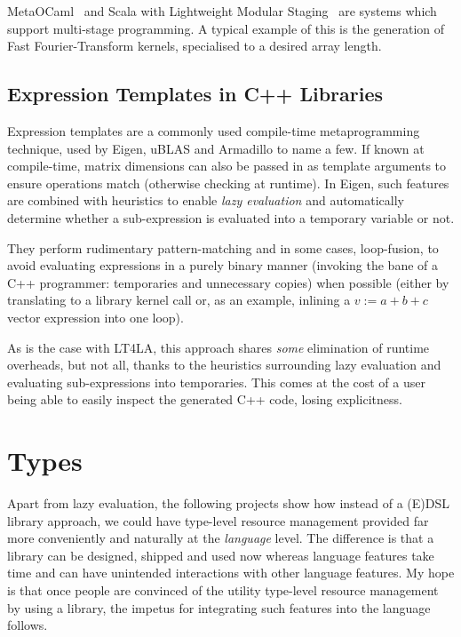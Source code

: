MetaOCaml~\cite{metaocaml} and Scala with Lightweight Modular
Staging~\cite{scala_lms} are systems which support multi-stage programming. A
typical example of this is the generation of Fast Fourier-Transform kernels,
specialised to a desired array length.

\subsection{Expression Templates in C++ Libraries}

Expression templates are a commonly used compile-time metaprogramming
technique, used by Eigen, uBLAS and Armadillo to name a few. If known at
compile-time, matrix dimensions can also be passed in as template arguments to
ensure operations match (otherwise checking at runtime). In Eigen, such
features are combined with heuristics to enable \emph{lazy evaluation} and
automatically determine whether a sub-expression is evaluated into a temporary
variable or not.

They perform rudimentary pattern-matching and in some cases, loop-fusion, to
avoid evaluating expressions in a purely binary manner (invoking the bane of a
C++ programmer: temporaries and unnecessary copies) when possible (either by
translating to a library kernel call or, as an example, inlining a $v := a + b
+ c$ vector expression into one loop).

As is the case with LT4LA, this approach shares \emph{some} elimination of
runtime overheads, but not all, thanks to the heuristics surrounding lazy
evaluation and evaluating sub-expressions into temporaries. This comes at the
cost of a user being able to easily inspect the generated C++ code, losing
explicitness.

\section{Types}

Apart from lazy evaluation, the following projects show how instead of a (E)DSL
library approach, we could have type-level resource management provided far
more conveniently and naturally at the \emph{language} level. The difference is
that a library can be designed, shipped and used now whereas language features
take time and can have unintended interactions with other language features. My
hope is that once people are convinced of the utility type-level resource
management by using a library, the impetus for integrating such features into
the language follows.

